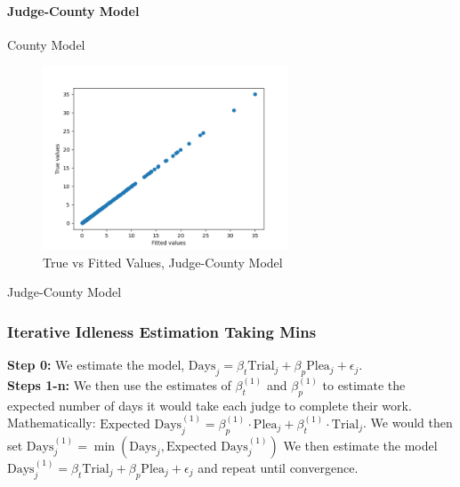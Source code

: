 \documentclass[11pt, oneside]{article}   	%
\theoremstyle{ModifiedStyle}
\begin{document}
			\paragraph{Judge-County Model}

				\begin{table}[H]
					\centering
					\caption{County Model}
					
				\end{table}

				\begin{figure}[H]
					\centering
					\includegraphics[width=0.65\textwidth]{../../output/figures/Exploration/fit_utilization_JudgeIDCounty}
					\caption{True vs Fitted Values, Judge-County Model}
				\end{figure}

				\begin{table}[H]
					\centering
					\caption{Judge-County Model}
					
				\end{table}


	  \subsubsection{Iterative Idleness Estimation Taking Mins}
			\textbf{Step 0:} We estimate the model, $\text{Days}_j = \beta_t\text{Trial}_j + \beta_p\text{Plea}_j +\epsilon_j$. \\

		  \noindent \textbf{Steps 1-n:} We then use the estimates of $\beta^{(1)}_t$ and $\beta^{(1)}_p$ to estimate the expected number
		  of days it would take each judge to complete their work. Mathematically: $\text{Expected Days}^{(1)}_j = \beta^{(1)}_p \cdot \text{Plea}_j + \beta^{(1)}_t \cdot \text{Trial}_j$.
		  We would then set $\text{Days}^{(1)}_j = \min(\text{Days}_j,\text{Expected Days}^{(1)}_j)$ We then estimate the model $\text{Days}^{(1)}_j = \beta_t\text{Trial}_j + \beta_p\text{Plea}_j +\epsilon_j$ and repeat until convergence.
\end{document}
